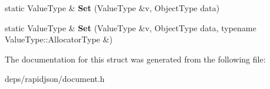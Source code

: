 \begin{DoxyCompactItemize}
\item 
static Value\+Type \& {\bfseries Set} (Value\+Type \&v, Object\+Type data)\hypertarget{structinternal_1_1_type_helper_3_01_value_type_00_01typename_01_value_type_1_1_object_01_4_a7655ed9b6c7443d99063ec20769b9984}{}\label{structinternal_1_1_type_helper_3_01_value_type_00_01typename_01_value_type_1_1_object_01_4_a7655ed9b6c7443d99063ec20769b9984}

\item 
static Value\+Type \& {\bfseries Set} (Value\+Type \&v, Object\+Type data, typename Value\+Type\+::\+Allocator\+Type \&)\hypertarget{structinternal_1_1_type_helper_3_01_value_type_00_01typename_01_value_type_1_1_object_01_4_a41825b964c6188a07539b7ab2e6ed194}{}\label{structinternal_1_1_type_helper_3_01_value_type_00_01typename_01_value_type_1_1_object_01_4_a41825b964c6188a07539b7ab2e6ed194}

\end{DoxyCompactItemize}


The documentation for this struct was generated from the following file\+:\begin{DoxyCompactItemize}
\item 
deps/rapidjson/document.\+h\end{DoxyCompactItemize}

